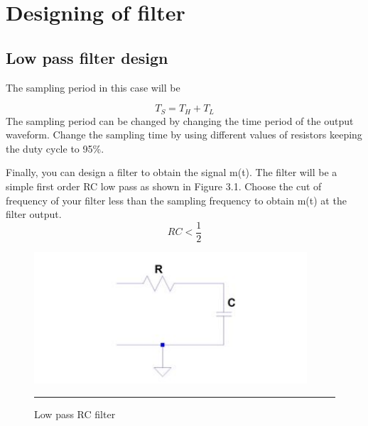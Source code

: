 
\chapter{Designing of filter} %
\label{Chapter2}
 \section{Low pass filter design}
 The sampling period in this case will be

    \[T_S=T_H+T_L\]
The sampling period can be changed by changing the time period of the output waveform. Change the sampling time by using different values of resistors keeping the duty cycle to 95\%.


	Finally, you can design a filter to obtain the signal m(t). The filter will be a simple first order RC low pass as shown in Figure 3.1. Choose the cut of frequency of your filter less than the sampling frequency to obtain m(t) at the filter output.
    \[RC < \frac{1}{2} \]

	\begin{figure}[htbp]
	\centering
	\includegraphics[width = 4in]{./Figures/filter.jpg}
	\rule{35em}{0.5pt}
	\caption{Low pass RC filter}
\end{figure}